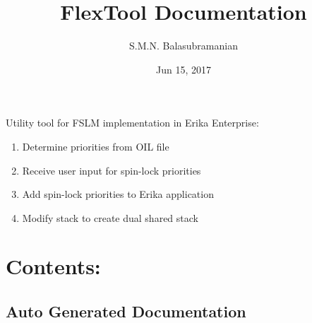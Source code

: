 \documentclass[letterpaper,10pt,english]{sphinxmanual}
\title{FlexTool Documentation}
\date{Jun 15, 2017}
\author{S.M.N. Balasubramanian}
\begin{document}
\maketitle
\sphinxtableofcontents
{}\label{\detokenize{index::doc}}


Utility tool for FSLM implementation in Erika Enterprise:
\begin{enumerate}
\item {} 
Determine priorities from OIL file

\item {} 
Receive user input for spin-lock priorities

\item {} 
Add spin-lock priorities to Erika application

\item {} 
Modify stack to create dual shared stack

\end{enumerate}


\chapter{Contents:}
\label{\detokenize{index:contents}}\label{\detokenize{index:welcome-to-flextool-s-documentation}}

\section{Auto Generated Documentation}
\label{\detokenize{code:module-FlexTool}}\label{\detokenize{code:auto-generated-documentation}}\label{\detokenize{code::doc}}
\end{document}
